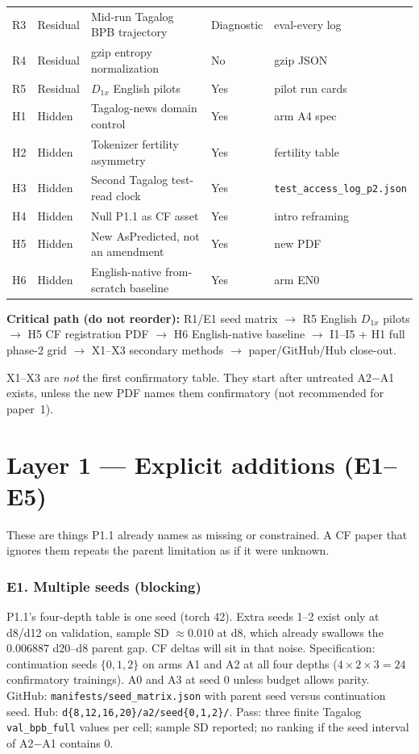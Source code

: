 \documentclass[11pt,a4paper]{article}
\begin{document}
\begin{center}
\begin{tabular}{lllll}
R3 & Residual & Mid-run Tagalog BPB trajectory & Diagnostic & eval-every log \\
R4 & Residual & gzip entropy normalization & No & gzip JSON \\
R5 & Residual & $D_{1x}$ English pilots & Yes & pilot run cards \\
H1 & Hidden & Tagalog-news domain control & Yes & arm A4 spec \\
H2 & Hidden & Tokenizer fertility asymmetry & Yes & fertility table \\
H3 & Hidden & Second Tagalog test-read clock & Yes & \texttt{test\_access\_log\_p2.json} \\
H4 & Hidden & Null P1.1 as CF asset & Yes & intro reframing \\
H5 & Hidden & New AsPredicted, not an amendment & Yes & new PDF \\
H6 & Hidden & English-native from-scratch baseline & Yes & arm EN0 \\
\bottomrule
\end{tabular}
\end{center}

\textbf{Critical path (do not reorder):} R1/E1 seed matrix $\rightarrow$ R5 English $D_{1x}$ pilots $\rightarrow$ H5 CF registration PDF $\rightarrow$ H6 English-native baseline $\rightarrow$ I1--I5 + H1 full phase-2 grid $\rightarrow$ X1--X3 secondary methods $\rightarrow$ paper/GitHub/Hub close-out.

X1--X3 are \emph{not} the first confirmatory table. They start after untreated A2$-$A1 exists, unless the new PDF names them confirmatory (not recommended for paper~1).

\section{Layer 1 --- Explicit additions (E1--E5)}
\label{sec:L1}

These are things P1.1 already names as missing or constrained. A CF paper that ignores them repeats the parent limitation as if it were unknown.

\subsubsection*{E1. Multiple seeds (blocking)}
P1.1's four-depth table is one seed (torch 42). Extra seeds 1--2 exist only at d8/d12 on validation, sample SD $\approx 0.010$ at d8, which already swallows the $0.006887$ d20--d8 parent gap. CF deltas will sit in that noise. Specification: continuation seeds $\{0,1,2\}$ on arms A1 and A2 at all four depths ($4\times 2\times 3=24$ confirmatory trainings). A0 and A3 at seed 0 unless budget allows parity. GitHub: \texttt{manifests/seed\_matrix.json} with parent seed versus continuation seed. Hub: \texttt{d\{8,12,16,20\}/a2/seed\{0,1,2\}/}. Pass: three finite Tagalog \texttt{val\_bpb\_full} values per cell; sample SD reported; no ranking if the seed interval of A2$-$A1 contains 0.
\end{document}
